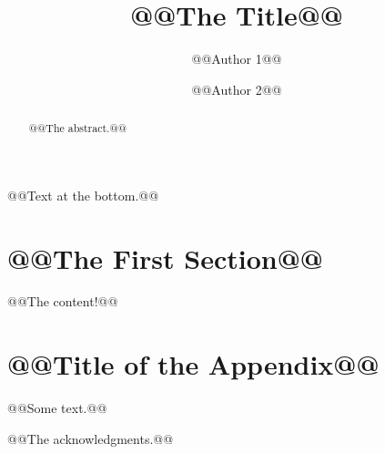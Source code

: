 \documentclass{acmtog}
\begin{document}

\title{@@The Title@@}

\author{%
@@Author 1@@
%
\and%
@@Author 2@@
}





\maketitle

\begin{bottomstuff}
@@Text at the bottom.@@
\end{bottomstuff}

\begin{abstract}
@@The abstract.@@
\end{abstract}

\section{@@The First Section@@}

@@The content!@@

\appendix

\section{@@Title of the Appendix@@}

@@Some text.@@

\begin{acks}
@@The acknowledgments.@@
\end{acks}




\end{document}
